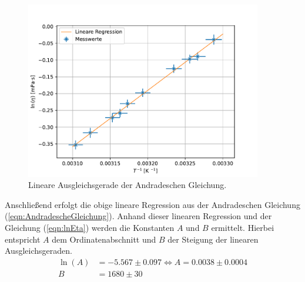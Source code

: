 \begin{figure}[H]
  \centering
  \includegraphics[width=0.92\textwidth]{plot.pdf}
  \caption{Lineare Ausgleichsgerade der Andradeschen Gleichung.}
  \label{fig:plot}
\end{figure}
Anschließend erfolgt die obige lineare Regression aus 
der Andradeschen Gleichung (\ref{eqn:AndradescheGleichung}). 
Anhand dieser linearen Regression und der Gleichung (\ref{eqn:lnEta}) werden die Konstanten $A$ und $B$ 
ermittelt. Hierbei entspricht $A$ dem Ordinatenabschnitt und $B$ der Steigung der 
linearen Ausgleichsgeraden.
\begin{align*}
  \ln\left(A\right) &= -5.567 \pm 0.097 \Longleftrightarrow A = 0.0038\pm0.0004\\
  B &= 1680\pm30
\end{align*}
